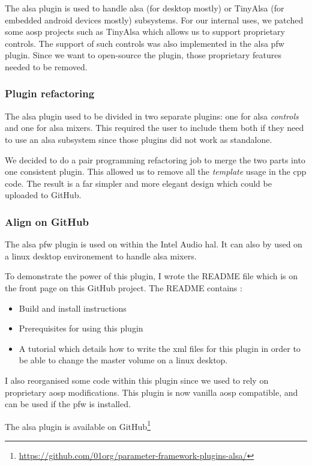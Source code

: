 The \gls{alsa} plugin is used to handle \gls{alsa} (for desktop mostly) or TinyAlsa (for embedded \gls{android} devices mostly) subsystems.
For our internal uses, we patched some \gls{aosp} projects such as TinyAlsa which allows us to support proprietary controls.
The support of such controls was also implemented in the \gls{alsa} \gls{pfw} plugin. Since
we want to open-source the plugin, those proprietary features needed to be removed.

\subsubsection{Plugin refactoring}
The \gls{alsa} plugin used to be divided in two separate plugins: one for \gls{alsa} \emph{controls} and one for \gls{alsa} mixers.
This required the user to include them both if they need to use an \gls{alsa} subsystem since those plugins did not work as
standalone.

We decided to do a pair programming refactoring job to merge the two parts into one consistent plugin.
This allowed us to remove all the \emph{template} usage in the \gls{cpp} code.
The result is a far simpler and more elegant design which could be uploaded to \gls{GitHub}.

\subsubsection{Align on GitHub}
The \gls{alsa} \gls{pfw} plugin is used on within the Intel Audio \gls{hal}. It can also by used
on a linux desktop environement to handle \gls{alsa} mixers.

To demonstrate the power of this plugin, I wrote the README file which is on the
front page on this \gls{GitHub} project.  The README contains :
\begin{itemize}
    \item Build and install instructions
    \item Prerequisites for using this plugin
    \item A tutorial which details how to write the \gls{xml} files for this
    plugin in order to be able to change the master volume on a linux desktop.
\end{itemize}
I also reorganised some code within this plugin since we used to rely on proprietary \gls{aosp} modifications.
This plugin is now vanilla \gls{aosp} compatible, and can be used if the \gls{pfw} is installed.

The \gls{alsa} plugin is available on \gls{GitHub}\footnote{\url{https://github.com/01org/parameter-framework-plugins-alsa/}}
